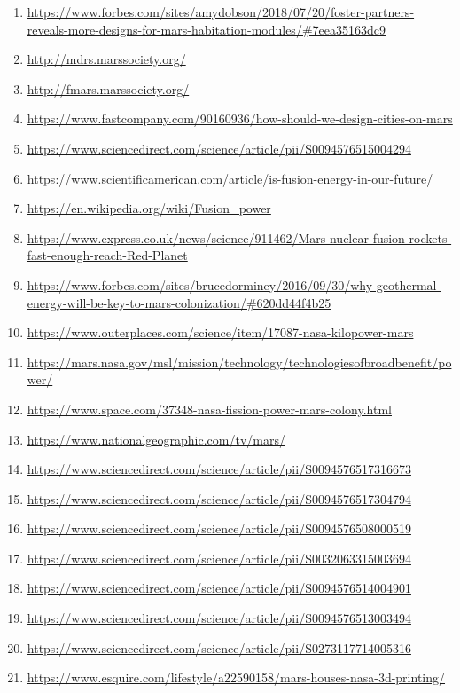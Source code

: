\documentclass{article}
\begin{document}
\begin{enumerate}
  \item \url{https://www.forbes.com/sites/amydobson/2018/07/20/foster-partners-reveals-more-designs-for-mars-habitation-modules/#7eea35163dc9}
  \item \url{http://mdrs.marssociety.org/}
  \item \url{http://fmars.marssociety.org/}
  \item \url{https://www.fastcompany.com/90160936/how-should-we-design-cities-on-mars}
  \item \url{https://www.sciencedirect.com/science/article/pii/S0094576515004294}
  \item \url{https://www.scientificamerican.com/article/is-fusion-energy-in-our-future/}
  \item \url{https://en.wikipedia.org/wiki/Fusion_power}
  \item \url{https://www.express.co.uk/news/science/911462/Mars-nuclear-fusion-rockets-fast-enough-reach-Red-Planet}
  \item \url{https://www.forbes.com/sites/brucedorminey/2016/09/30/why-geothermal-energy-will-be-key-to-mars-colonization/#620dd44f4b25}
  \item \url{https://www.outerplaces.com/science/item/17087-nasa-kilopower-mars}
  \item \url{https://mars.nasa.gov/msl/mission/technology/technologiesofbroadbenefit/power/}
  \item \url{https://www.space.com/37348-nasa-fission-power-mars-colony.html}
  \item \url{https://www.nationalgeographic.com/tv/mars/}
  \item \url{https://www.sciencedirect.com/science/article/pii/S0094576517316673}
  \item \url{https://www.sciencedirect.com/science/article/pii/S0094576517304794}
  \item \url{https://www.sciencedirect.com/science/article/pii/S0094576508000519}
  \item \url{https://www.sciencedirect.com/science/article/pii/S0032063315003694}
  \item \url{https://www.sciencedirect.com/science/article/pii/S0094576514004901}
  \item \url{https://www.sciencedirect.com/science/article/pii/S0094576513003494}
  \item \url{https://www.sciencedirect.com/science/article/pii/S0273117714005316}
  \item \url{https://www.esquire.com/lifestyle/a22590158/mars-houses-nasa-3d-printing/}

\end{enumerate}
\end{document}
